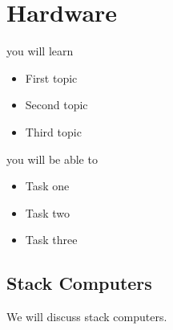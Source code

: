 \setchapterpreamble[u]{\margintoc}
\chapter{Hardware}

%
\begin{kaobox}[frametitle=In This Chapter]
you will learn
\begin{itemize}
	\item First topic
	\item Second topic
        \item Third topic
\end{itemize}

you will be able to
\begin{itemize}
        \item Task one
        \item Task two
        \item Task three
\end{itemize}
\end{kaobox}

\blindtext

%
\section{Stack Computers}
We will discuss stack computers.

